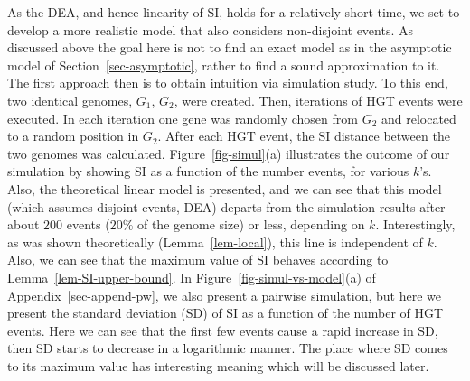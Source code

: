 \documentclass[runningheads, 11pt]{llncs}
\begin{document}
As the DEA, and hence linearity of SI, holds for a relatively short time, we set
to develop a more realistic model that also considers non-disjoint events. As
discussed above the goal here is not to find an exact model as in the asymptotic
model of Section~\ref{sec-asymptotic}, rather to find a sound approximation to
it. The first approach then is to obtain intuition via simulation study.
To this end, two identical genomes, $G_1$, $G_2$, were created. Then, iterations
of HGT events were executed. In each iteration one gene was randomly chosen from
$G_2 $ and relocated to a random position in $G_2$. After each HGT event, the SI
distance between the two genomes was calculated. Figure~\ref{fig-simul}(a)
illustrates the outcome of our simulation by showing SI as a function of the
number events, for various $k$'s. Also, the theoretical linear model is
presented, and we can see that this model (which assumes disjoint events, DEA)
departs from the simulation results after about $200$ events ($20\%$ of the
genome size) or less, depending on $k$.  Interestingly, as was shown
theoretically (Lemma~\ref{lem-local}), this line is independent of $k$. Also, we
can see that the maximum value of SI behaves according to
Lemma~\ref{lem-SI-upper-bound}. In Figure~\ref{fig-simul-vs-model}(a) of
Appendix~\ref{sec-append-pw}, we also present a pairwise simulation, but here we
present the standard deviation (SD) of SI as a function of the number of HGT
events. Here we can see that the first few events cause a rapid increase in SD,
then SD starts to decrease in a logarithmic manner. The place where SD comes to
its maximum value has interesting meaning which will be discussed later.
\end{document}
